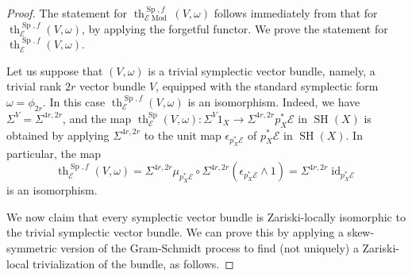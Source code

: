 \documentclass[10pt]{amsart}
\theoremstyle{definition}
\theoremstyle{plain}
\numberwithin{equation}{section}
\newcommand{\0}{\emptyset}
\newcommand{\sE}{{\mathcal E}}
\newcommand{\Sp}{{\operatorname{Sp}}}
\newcommand{\SH}{{\operatorname{SH}}}
\renewcommand{\th}{{\operatorname{th}}}
\newcommand{\Mod}{{\operatorname{Mod}}}
\newcommand{\id}{{\operatorname{id}}}
\begin{document}
\begin{proof}
    The statement for $\th^{\Sp, f}_{\sE\Mod}(V,\omega)$ follows immediately from that for $\th^{\Sp,f}_{\sE}(V,\omega)$, by applying the forgetful functor. We prove the statement for $\th^{\Sp,f}_{\sE}(V,\omega)$.

    Let us suppose that $(V,\omega)$ is a trivial symplectic vector bundle, namely, a trivial rank $2r$ vector bundle $V$, equipped with the standard symplectic form $\omega = \phi_{2r}$. In this case $\th^{\Sp,f}_{\sE}(V,\omega)$ is an isomorphism. Indeed, we have $\Sigma^V=\Sigma^{4r,2r}$, and the map $\th_{\sE}^\Sp(V,\omega): \Sigma^V1_X \to \Sigma^{4r,2r}p_X^*\sE$ in $\SH(X)$ is obtained by applying $\Sigma^{4r,2r}$ to the unit map $\epsilon_{p_X^*\sE}$ of $p_X^*\sE$ in $\SH(X)$. In particular, the map 
    $$\th^{\Sp,f}_{\sE}(V,\omega)=\Sigma^{4r,2r}\mu_{p_X^*\sE} \circ \Sigma^{4r,2r}(\epsilon_{p_X^*\sE} \wedge 1) = \Sigma^{4r,2r}\id_{p_X^*\sE}$$
    is an isomorphism.

We now claim that every symplectic vector bundle is Zariski-locally isomorphic to the trivial symplectic vector bundle. We can prove this by applying a skew-symmetric version of the Gram-Schmidt process to find (not uniquely) a Zariski-local trivialization of the bundle, as follows.


\end{proof}
\end{document}
